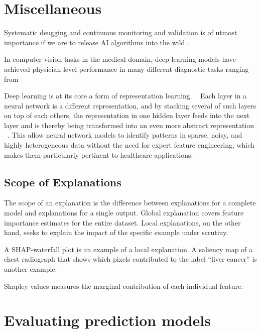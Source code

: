 
\section{Miscellaneous}

Systematic deugging and continuous monitoring and validation 
is of utmost importance if we are to release AI algorithms into the wild%
\autocite{topolHighperformance2019}.

In computer vision tasks in the medical domain,
deep-learning models have achieved physician-level performance
in many different diagnostic tasks
ranging from


Deep learning is at its core a form of representation learning.
~\autocite{estevaGuide2019}
Each layer in a neural network is a different representation,
and by stacking several of such layers on top of each others,
the representation in one hidden layer
feeds into the next layer and
is thereby being transformed into an even more abstract representation%
~\autocite{estevaGuide2019}.
This allow neural network models to identify patterns in sparse, noisy,
and highly heterogeneous data without the need for expert feature engineering,
which makes them particularly pertinent to healthcare applications.%
~



\subsection{Scope of Explanations}

The scope of an explanation is the difference between
explanations for a complete model and
explanations for a single output.
Global explanation covers feature importance estimates 
for the entire dataset.
Local explanations, on the other hand, seeks to explain
the impact of the specific example under scrutiny.

A SHAP-waterfall plot is an example of a local explanation.
A saliency map of a chest radiograph that shows
which pixels contributed to the label \enquote{liver cancer}
is another example.

Shapley values measures the marginal contribution
of each individual feature.


\section{Evaluating prediction models}

